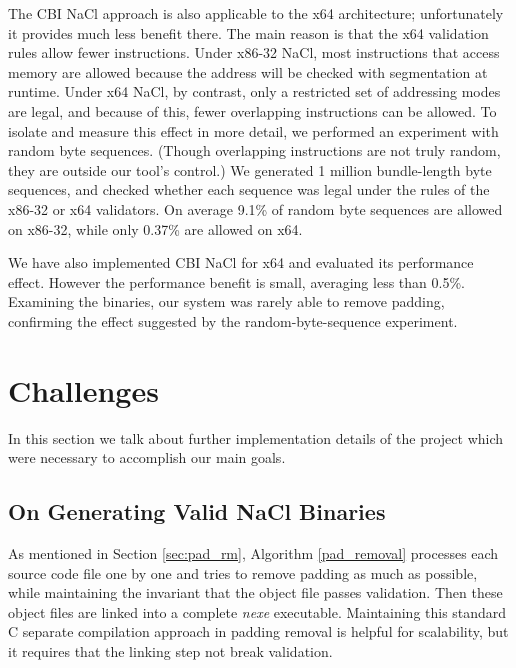 \documentclass[conference]{IEEEtran}
\begin{document}
The CBI NaCl approach is also applicable to the x64 architecture;
unfortunately it provides much less benefit there.
%
The main reason is that the x64 validation rules allow fewer
instructions.
Under x86-32 NaCl, most instructions that access memory are allowed
because the address will be checked with segmentation at runtime.
Under x64 NaCl, by contrast, only a restricted set of addressing modes
are legal, and because of this, fewer overlapping instructions can be
allowed.
%
To isolate and measure this effect in more detail, we performed an
experiment with random byte sequences.
(Though overlapping instructions are not truly random, they are
outside our tool's control.)
We generated 1 million bundle-length byte sequences, and checked
whether each sequence was legal under the rules of the x86-32 or x64
validators.
On average 9.1\% of random byte sequences are allowed on x86-32, while
only 0.37\% are allowed on x64.

We have also implemented CBI NaCl for x64 and evaluated its
performance effect.
%
However the performance benefit is small, averaging less than 0.5\%.
%
Examining the binaries, our system was rarely able to remove padding,
confirming the effect suggested by the random-byte-sequence experiment.

\section{Challenges}
\label{challenge}
In this section we talk about further implementation details of the project which were necessary to accomplish our main goals.

\subsection{On Generating Valid NaCl Binaries}
\label{sec:gen-nexe}
As mentioned in Section \ref{sec:pad_rm}, Algorithm \ref{pad_removal} processes each source code file one by one and tries 
to remove padding as much as possible, while maintaining the invariant that the object file passes validation.
%
Then these object files are linked into a complete \textit{nexe} executable.
%
Maintaining this standard C separate compilation approach in padding removal is helpful for scalability, but it requires that the linking step not break validation.
\end{document}
